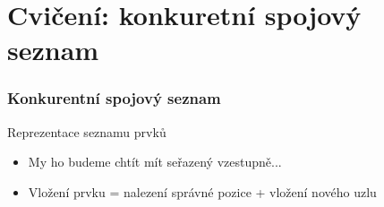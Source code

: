 \documentclass[usenames,dvipsnames,9pt]{beamer}
\begin{document}


\section{Cvičení: konkuretní spojový seznam}

{
\begin{frame}[fragile]
  \frametitle{Konkurentní spojový seznam}
  
  Reprezentace seznamu prvků
  \begin{itemize}
    \item My ho budeme chtít mít seřazený vzestupně...
    \item Vložení prvku = nalezení správné pozice + vložení nového uzlu
  \end{itemize}  
  
  \vspace{1em}


\end{frame}}
\end{document}
